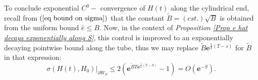 \documentclass{article}
\newcommand{\e}[1]{\mathbf{e}^{#1}}
\begin{document}
To conclude exponential $C^{0}-$%
convergence of $H\left( t\right) $ along the cylindrical end, recall from  $%
\left( \ref{eq bound on sigma}\right) $  that the constant  $\tilde{B}=(cst.)\sqrt{B}$ is obtained from the uniform bound $\hat{e} \leq B$. Now, in the context of \emph{Proposition \ref{Prop e hat decays exponentially along S}}, this control is improved to an exponentially decaying pointwise bound along the tube, thus we may replace $\tilde{B}\e{\frac{1}{2}(T-s)}$ for $\tilde{B}$ in that expression:%
%
\begin{equation}        \label{eq exp decay C0}
        \left.\sigma\left(H\left( t\right) ,H_{0}\right) \right\vert 
        _{\partial W_{S}}
        \leq 2\left( \e{\tilde{B}T\e{\frac{1}{2}(T-S)}}-1 \right)
        =
        O\left(\e{-S}\right) .  
\end{equation}
\end{document}
